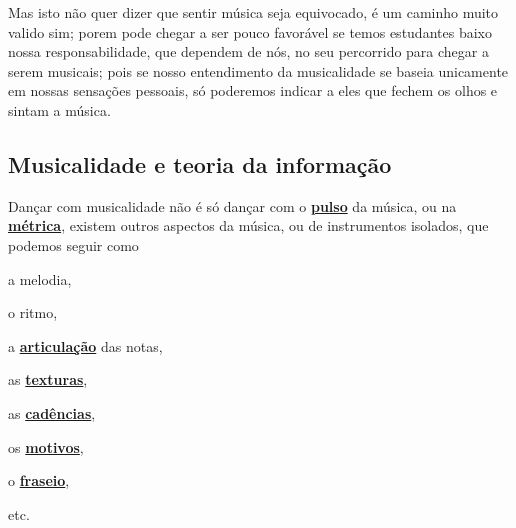 Mas isto não quer dizer que sentir música seja equivocado, é um caminho muito valido sim;
porem pode chegar a ser pouco favorável se temos estudantes baixo nossa responsabilidade,
 que dependem de nós, no seu percorrido para chegar a serem musicais; 
pois se nosso entendimento da musicalidade se baseia unicamente em nossas sensações pessoais,
só poderemos indicar a eles que fechem os olhos e sintam a música.


\subsection{Musicalidade e teoria da informação}

Dançar com musicalidade não é só dançar com o \hyperref[ref:Pulso]{\textbf{pulso}} da música, 
ou na \hyperref[def:Metrica]{\textbf{métrica}},
existem outros aspectos da música, ou de instrumentos isolados, que podemos seguir como 
\begin{inparaitem} 
\item a melodia, 
\item o ritmo,
\item a \hyperref[sub:Articulação]{\textbf{articulação}} das notas, 
\item as \hyperref[sec:texturasmusica]{\textbf{texturas}}, 
\item as \hyperref[sec:Cadencia]{\textbf{cadências}}, 
\item os \hyperref[sec:Motivo]{\textbf{motivos}}, 
\item o \hyperref[sec:fraseio]{\textbf{fraseio}}, 
\item etc.
\end{inparaitem} 

